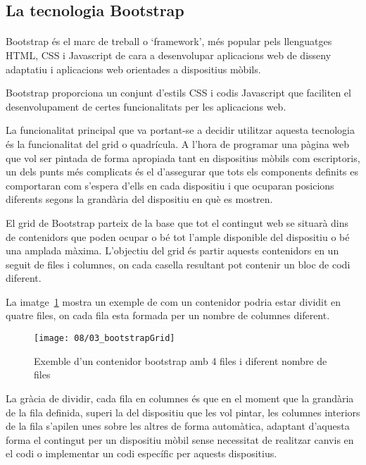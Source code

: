 \subsection{La tecnologia Bootstrap}

    \paragraph{}
    Bootstrap és el marc de treball o `framework', més popular pels llenguatges HTML, CSS i Javascript de cara a desenvolupar aplicacions web de disseny adaptatiu i aplicacions web orientades a dispositius mòbils.

    Bootstrap proporciona un conjunt d'estils CSS i codis Javascript que faciliten el desenvolupament de certes funcionalitats per les aplicacions web.

    La funcionalitat principal que va portant-se a decidir utilitzar aquesta tecnologia és la funcionalitat del grid o quadrícula. A l'hora de programar una pàgina web que vol ser pintada de forma apropiada tant en dispositius mòbils com escriptoris, un dels punts més complicats és el d'assegurar que tots els components definits es comportaran com s'espera d'ells en cada dispositiu i que ocuparan posicions diferents segons la grandària del dispositiu en què es mostren.

    El grid de Bootstrap parteix de la base que tot el contingut web se situarà dins de contenidors que poden ocupar o bé tot l'ample disponible del dispositiu o bé una amplada màxima. L’objectiu del grid és partir aquests contenidors en un seguit de files i columnes, on cada casella resultant pot contenir un bloc de codi diferent.

    La imatge~\ref{img:gridSimple} mostra un exemple de com un contenidor podria estar dividit en quatre files, on cada fila esta formada per un nombre de columnes diferent.

    \begin{figure}[h]
        \texttt{[image: 08/03\_bootstrapGrid]}
        \centering
        \caption{Exemble d'un contenidor bootstrap amb 4 files i diferent nombre de files}\label{img:gridSimple}
    \end{figure}

    La gràcia de dividir, cada fila en columnes és que en el moment que la grandària de la fila definida, superi la del dispositiu que les vol pintar, les columnes interiors de la fila s'apilen unes sobre les altres de forma automàtica, adaptant d'aquesta forma el contingut per un dispositiu mòbil sense necessitat de realitzar canvis en el codi o implementar un codi específic per aquests dispositius.

